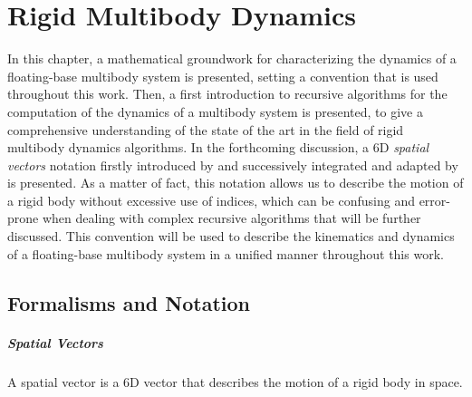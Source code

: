 \chapter{Rigid Multibody Dynamics}
\label{chp:back_RBDynamics}

In this chapter, a mathematical groundwork for characterizing the dynamics of a floating-base multibody system is presented, setting a convention that is used throughout this work. Then, a first introduction to recursive algorithms for the computation of the dynamics of a multibody system is presented, to give a comprehensive understanding of the state of the art in the field of rigid multibody dynamics algorithms. In the forthcoming discussion, a 6D \textit{spatial vectors} notation firstly introduced by \citet{featherstone_rigid_2008} and successively integrated and adapted by \citet{traversaro_multibody_2019} is presented. As a matter of fact, this notation allows us to describe the motion of a rigid body without excessive use of indices, which can be confusing and error-prone when dealing with complex recursive algorithms that will be further discussed. This convention will be used to describe the kinematics and dynamics of a floating-base multibody system in a unified manner throughout this work.

\section{Formalisms and Notation}

\paragraph{Spatial Vectors} A spatial vector is a 6D vector that describes the motion of a rigid body in space.

